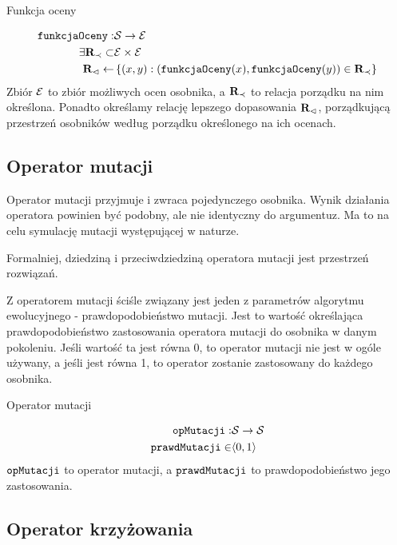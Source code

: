 \documentclass[./FM_mgr.tex]{subfiles}
\begin{document}
\begin{signature}
	\caption{Funkcja oceny \label{signature:eval}}
	\begin{align}
		\mathtt{funkcjaOceny}: &\mathcal{S} \rightarrow \mathcal{E} \\
		\exists {\mathbf{R}}_{\prec} \subset &\mathcal{E} \times \mathcal{E} \\
		{\mathbf{R}}_{\lhd} \gets &\left\{ (x, y): (\mathtt{funkcjaOceny}(x), \mathtt{funkcjaOceny}(y)) \in {\mathbf{R}}_{\prec} \right\}
	\end{align}
	Zbiór $\mathcal{E}$ to zbiór możliwych ocen osobnika, 
	a ${\mathbf{R}}_{\prec}$ to relacja porządku na nim określona. Ponadto określamy relację lepszego dopasowania ${\mathbf{R}}_{\lhd}$, porządkującą przestrzeń osobników według porządku określonego na ich ocenach. 
\end{signature}

\subsection{Operator mutacji}

Operator mutacji przyjmuje i zwraca pojedynczego osobnika.
Wynik działania operatora powinien być podobny, ale nie identyczny do argumentuz.
Ma to na celu symulację mutacji występującej w naturze.

Formalniej, dziedziną i przeciwdziedziną operatora mutacji jest przestrzeń rozwiązań.

Z operatorem mutacji ściśle związany jest jeden z parametrów algorytmu ewolucyjnego - prawdopodobieństwo mutacji. 
Jest to wartość określająca prawdopodobieństwo zastosowania operatora mutacji do osobnika w danym pokoleniu. 
Jeśli wartość ta jest równa 0, to operator mutacji nie jest w ogóle używany, a jeśli jest równa 1, to operator zostanie zastosowany do każdego osobnika.

\begin{signature}
	\caption{Operator mutacji \label{signature:mutation}}
	\begin{align}
		\mathtt{opMutacji}: & \mathcal{S} \rightarrow \mathcal{S} \\
		\mathtt{prawdMutacji} \in & \langle0, 1\rangle
	\end{align}
	$\mathtt{opMutacji}$ to operator mutacji, a $\mathtt{prawdMutacji}$ to prawdopodobieństwo jego zastosowania.
\end{signature}	

\subsection{Operator krzyżowania} \label{subsection:crossover}
\end{document}
